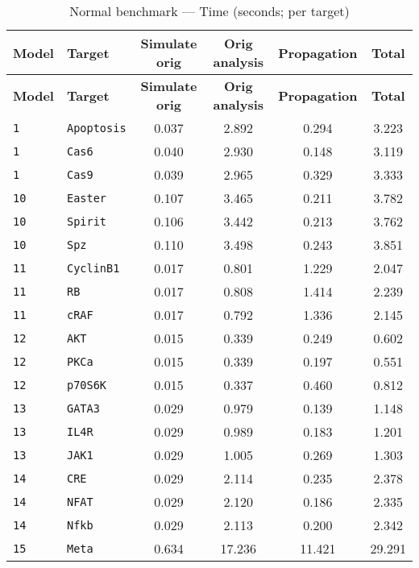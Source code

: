 \clearpage
\begingroup
\small
\setlength{\tabcolsep}{4pt}
\renewcommand{\arraystretch}{1.0}
\begin{longtable}{llcccc}
\caption{Normal benchmark --- Time (seconds; per target)}\label{tab:normal\_time} \\
\toprule
\textbf{Model} & \textbf{Target} & \textbf{Simulate orig} & \textbf{Orig analysis} & \textbf{Propagation} & \textbf{Total} \\
\midrule
\endfirsthead
\toprule
\textbf{Model} & \textbf{Target} & \textbf{Simulate orig} & \textbf{Orig analysis} & \textbf{Propagation} & \textbf{Total} \\
\midrule
\endhead
\midrule
\endfoot
\bottomrule
\endlastfoot
\texttt{1} & \texttt{Apoptosis} & 0.037 & 2.892 & 0.294 & 3.223 \\
\texttt{1} & \texttt{Cas6} & 0.040 & 2.930 & 0.148 & 3.119 \\
\texttt{1} & \texttt{Cas9} & 0.039 & 2.965 & 0.329 & 3.333 \\
\texttt{10} & \texttt{Easter} & 0.107 & 3.465 & 0.211 & 3.782 \\
\texttt{10} & \texttt{Spirit} & 0.106 & 3.442 & 0.213 & 3.762 \\
\texttt{10} & \texttt{Spz} & 0.110 & 3.498 & 0.243 & 3.851 \\
\texttt{11} & \texttt{CyclinB1} & 0.017 & 0.801 & 1.229 & 2.047 \\
\texttt{11} & \texttt{RB} & 0.017 & 0.808 & 1.414 & 2.239 \\
\texttt{11} & \texttt{cRAF} & 0.017 & 0.792 & 1.336 & 2.145 \\
\texttt{12} & \texttt{AKT} & 0.015 & 0.339 & 0.249 & 0.602 \\
\texttt{12} & \texttt{PKCa} & 0.015 & 0.339 & 0.197 & 0.551 \\
\texttt{12} & \texttt{p70S6K} & 0.015 & 0.337 & 0.460 & 0.812 \\
\texttt{13} & \texttt{GATA3} & 0.029 & 0.979 & 0.139 & 1.148 \\
\texttt{13} & \texttt{IL4R} & 0.029 & 0.989 & 0.183 & 1.201 \\
\texttt{13} & \texttt{JAK1} & 0.029 & 1.005 & 0.269 & 1.303 \\
\texttt{14} & \texttt{CRE} & 0.029 & 2.114 & 0.235 & 2.378 \\
\texttt{14} & \texttt{NFAT} & 0.029 & 2.120 & 0.186 & 2.335 \\
\texttt{14} & \texttt{Nfkb} & 0.029 & 2.113 & 0.200 & 2.342 \\
\texttt{15} & \texttt{Meta} & 0.634 & 17.236 & 11.421 & 29.291 \\

\end{longtable}
